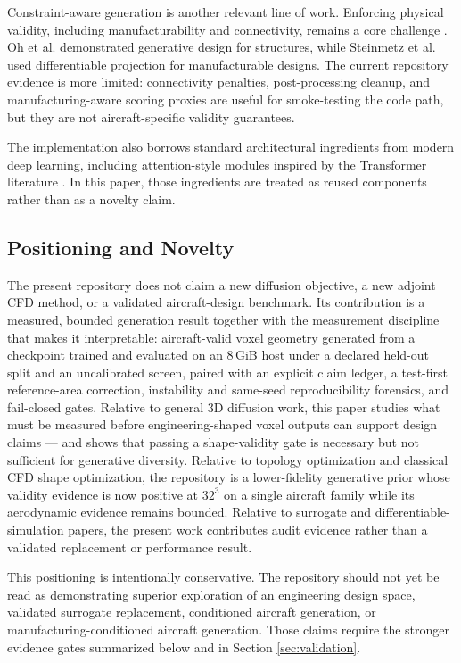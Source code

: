 Constraint-aware generation is another relevant line of work. Enforcing physical validity, including manufacturability and connectivity, remains a core challenge \cite{wang2023physics}. Oh et al. \cite{oh2019deep} demonstrated generative design for structures, while Steinmetz et al. \cite{steinmetz2022generative} used differentiable projection for manufacturable designs. The current repository evidence is more limited: connectivity penalties, post-processing cleanup, and manufacturing-aware scoring proxies are useful for smoke-testing the code path, but they are not aircraft-specific validity guarantees.

The implementation also borrows standard architectural ingredients from modern deep learning, including attention-style modules inspired by the Transformer literature \cite{vaswani2017attention}. In this paper, those ingredients are treated as reused components rather than as a novelty claim.

\subsection{Positioning and Novelty}
The present repository does not claim a new diffusion objective, a new adjoint CFD method, or a validated aircraft-design benchmark. Its contribution is a measured, bounded generation result together with the measurement discipline that makes it interpretable: aircraft-valid voxel geometry generated from a checkpoint trained and evaluated on an 8\,GiB host under a declared held-out split and an uncalibrated screen, paired with an explicit claim ledger, a test-first reference-area correction, instability and same-seed reproducibility forensics, and fail-closed gates. Relative to general 3D diffusion work, this paper studies what must be measured before engineering-shaped voxel outputs can support design claims — and shows that passing a shape-validity gate is necessary but not sufficient for generative diversity. Relative to topology optimization and classical CFD shape optimization, the repository is a lower-fidelity generative prior whose validity evidence is now positive at \(32^3\) on a single aircraft family while its aerodynamic evidence remains bounded. Relative to surrogate and differentiable-simulation papers, the present work contributes audit evidence rather than a validated replacement or performance result.

This positioning is intentionally conservative. The repository should not yet be read as demonstrating superior exploration of an engineering design space, validated surrogate replacement, conditioned aircraft generation, or manufacturing-conditioned aircraft generation. Those claims require the stronger evidence gates summarized below and in Section \ref{sec:validation}.

